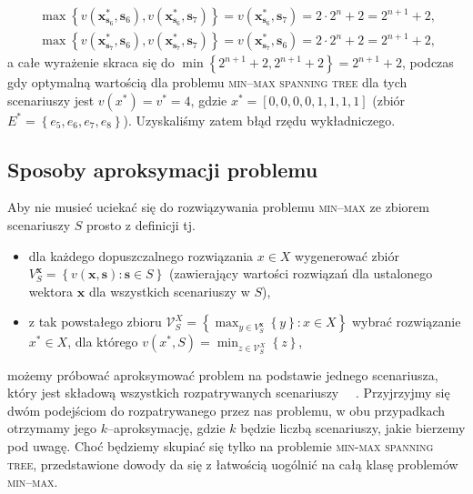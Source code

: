 \begin{eqnarray}
	\max \left\{ v \left( \textbf{x}^{\ast}_{\textbf{s}_{6}}, \textbf{s}_{6} \right), v \left( \textbf{x}^{\ast}_{\textbf{s}_{6}}, \textbf{s}_{7} \right) \right\} = v \left( \textbf{x}^{\ast}_{\textbf{s}_{6}}, \textbf{s}_{7} \right) = 2 \cdot 2^{n} + 2 = 2^{n+1} + 2\text{,} \\
	\max \left\{ v \left( \textbf{x}^{\ast}_{\textbf{s}_{7}}, \textbf{s}_{6} \right), v \left( \textbf{x}^{\ast}_{\textbf{s}_{7}}, \textbf{s}_{7} \right) \right\} = v \left( \textbf{x}^{\ast}_{\textbf{s}_{7}}, \textbf{s}_{6} \right) = 2 \cdot 2^{n} + 2 = 2^{n+1} + 2\text{,}
\end{eqnarray}
a całe wyrażenie skraca się do $\min \left\{ 2^{n+1} + 2, 2^{n+1} + 2  \right\} = 2^{n+1} + 2$, podczas gdy optymalną wartością dla problemu \textsc{min--max spanning tree} dla tych scenariuszy jest $v \left( x^{\ast} \right) = v^{\ast} = 4$, gdzie $x^{\ast} = \left[ 0, 0, 0, 0, 1, 1, 1, 1 \right]$ (zbiór $E^{\ast} = \left\{ e_{5}, e_{6}, e_{7}, e_{8} \right\}$). Uzyskaliśmy zatem błąd rzędu wykładniczego.

\subsection{Sposoby aproksymacji problemu}

Aby nie musieć uciekać się do rozwiązywania problemu \textsc{min--max} ze zbiorem scenariuszy $S$ prosto z definicji tj.

\begin{itemize}
	\item dla każdego dopuszczalnego rozwiązania $x \in X$ wygenerować zbiór $V^{\textbf{x}}_{S} = \left\{ v \left( \textbf{x}, \textbf{s} \right) : \textbf{s} \in S \right\}$ (zawierający wartości rozwiązań dla ustalonego wektora $\textbf{x}$ dla wszystkich scenariuszy w $S$),
	\item z tak powstałego zbioru $\mathcal{V}^{X}_{S} = \left\{ \max_{y \in V^{\textbf{x}}_{S}} \left\{ y \right\} : x \in X  \right\}$ wybrać rozwiązanie $x^{\ast} \in X$, dla którego $v \left( x^{\ast} , S \right) = \min_{z \in \mathcal{V}^{X}_{S}} \left\{ z \right\}$,
\end{itemize}
możemy próbować aproksymować problem na podstawie jednego scenariusza, który jest składową wszystkich rozpatrywanych scenariuszy ~\cite{minmaxApprox}~\cite[$430$]{minmaxSurvey}. Przyjrzyjmy się dwóm podejściom do rozpatrywanego przez nas problemu, w obu przypadkach otrzymamy jego $k$--aproksymację, gdzie $k$ będzie liczbą scenariuszy, jakie bierzemy pod uwagę. Choć będziemy skupiać się tylko na problemie \textsc{min-max spanning tree}, przedstawione dowody da się z łatwością uogólnić na całą klasę problemów \textsc{min--max}.

